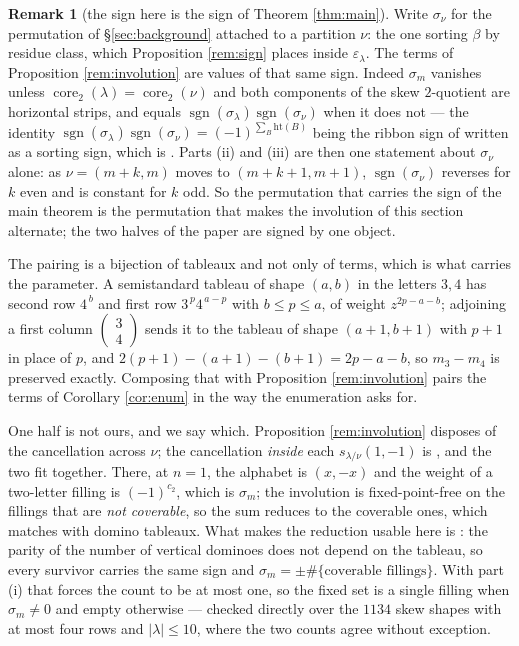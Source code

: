 \documentclass[11pt,reqno]{amsart}
\theoremstyle{plain}
\theoremstyle{definition}
\newtheorem{remark}[theorem]{Remark}
\newcommand{\sgn}{\operatorname{sgn}}
\newcommand{\core}{\operatorname{core}}
\begin{document}
\begin{remark}[the sign here is the sign of Theorem \ref{thm:main}]\label{rem:onesign}
Write $\sigma_\nu$ for the permutation of \S\ref{sec:background} attached to a partition $\nu$: the
one sorting $\beta$ by residue class, which Proposition \ref{rem:sign} places inside
$\varepsilon_\lambda$. The terms of Proposition \ref{rem:involution} are values of that same sign.
Indeed $\sigma_m$ vanishes unless $\core_2(\lambda)=\core_2(\nu)$ and both components of the skew
$2$-quotient are horizontal strips, and equals $\sgn(\sigma_\lambda)\sgn(\sigma_\nu)$ when it does
not --- the identity $\sgn(\sigma_\lambda)\sgn(\sigma_\nu)=(-1)^{\sum_B\mathrm{ht}(B)}$ being the
ribbon sign of \cite[p.~91]{Mac95} written as a sorting sign, which is
\cite[Lemma 6.3]{KumariThesis}. Parts {\rm(ii)} and {\rm(iii)} are
then one statement about $\sigma_\nu$ alone: as $\nu=(m+k,m)$ moves to $(m+k+1,m+1)$,
$\sgn(\sigma_\nu)$ reverses for $k$ even and is constant for $k$ odd. So the permutation that
carries the sign of the main theorem is the permutation that makes the involution of this section
alternate; the two halves of the paper are signed by one object.
\end{remark}

The pairing is a bijection of tableaux and not only of terms, which is what carries the parameter. A
semistandard tableau of shape $(a,b)$ in the letters $3,4$ has second row $4^{\,b}$ and first row
$3^{\,p}4^{\,a-p}$ with $b\le p\le a$, of weight $z^{2p-a-b}$; adjoining a first column
$\left(\begin{smallmatrix}3\\4\end{smallmatrix}\right)$ sends it to the tableau of shape
$(a+1,b+1)$ with $p+1$ in place of $p$, and $2(p+1)-(a+1)-(b+1)=2p-a-b$, so $m_3-m_4$ is preserved
exactly. Composing that with Proposition \ref{rem:involution} pairs the terms of Corollary
\ref{cor:enum} in the way the enumeration asks for.

One half is not ours, and we say which. Proposition \ref{rem:involution} disposes of the cancellation
across $\nu$; the cancellation \emph{inside} each $s_{\lambda/\nu}(1,-1)$ is
\cite{KumariThesis}, and the two fit together. There, at $n=1$, the alphabet is $(x,-x)$ and the
weight of a two-letter filling is $(-1)^{c_2}$, which is $\sigma_m$; the involution
\cite[Lemma 2.18]{KumariThesis} is fixed-point-free on the fillings that are \emph{not coverable},
so the sum reduces to the coverable ones, which \cite[Lemma 2.16]{KumariThesis} matches with domino
tableaux. What makes the reduction usable here is \cite[Lemma 2.14]{KumariThesis}: the parity of the
number of vertical dominoes does not depend on the tableau, so every survivor carries the same sign
and $\sigma_m=\pm\#\{\text{coverable fillings}\}$. With part (i) that forces the count to be at most
one, so the fixed set is a single filling when $\sigma_m\ne0$ and empty otherwise --- checked
directly over the $1134$ skew shapes with at most four rows and $|\lambda|\le10$, where the two
counts agree without exception.
\end{document}
